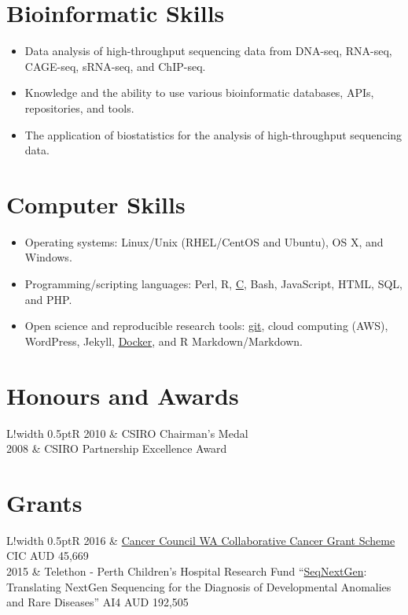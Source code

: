\documentclass[a4paper, 10pt]{article}
\newcommand\VRule{\color{lightgray}\vrule width 0.5pt}
\begin{document}
\section*{Bioinformatic Skills}

\begin{itemize}
   \setlength\itemsep{0em}
   \item Data analysis of high-throughput sequencing data from DNA-seq, RNA-seq, CAGE-seq, sRNA-seq, and ChIP-seq.
   \item Knowledge and the ability to use various bioinformatic databases, APIs, repositories, and tools.
   \item The application of biostatistics for the analysis of high-throughput sequencing data.
\end{itemize}

\section*{Computer Skills}

\begin{itemize}
   \setlength\itemsep{0em}
   \item Operating systems: Linux/Unix (RHEL/CentOS and Ubuntu), OS X, and Windows.
   \item Programming/scripting languages: Perl, R, \href{https://github.com/davetang/getting_started_with_c}{C}, Bash, JavaScript, HTML, SQL, and PHP.
   \item Open science and reproducible research tools: \href{https://github.com/davetang/getting_started_with_git}{git}, cloud computing (AWS), WordPress, Jekyll, \href{https://github.com/davetang/learning_docker/}{Docker}, and R Markdown/Markdown.
\end{itemize}

\section*{Honours and Awards}
\begin{tabular}{L!{\VRule}R}
   2010 & CSIRO Chairman's Medal \\
   2008 & CSIRO Partnership Excellence Award \\
\end{tabular}

\section*{Grants}
\begin{tabular}{L!{\VRule}R}
   2016 & \href{https://www.cancerwa.asn.au/research/funding/collaborative_cancer_grant_scheme/}{Cancer Council WA Collaborative Cancer Grant Scheme} CIC AUD 45,669 \\
   2015 & Telethon - Perth Children's Hospital Research Fund ``\href{http://telethonkids.org.au/our-research/projects-index/g/genetics-seqnextgen-translating-nextgen-sequencing-for-the-diagnosis-of-developmental-anomalies-and-rare-diseases/}{SeqNextGen}: Translating NextGen Sequencing for the Diagnosis of Developmental Anomalies and Rare Diseases'' AI4 AUD 192,505 \\
\end{tabular}
\end{document}
